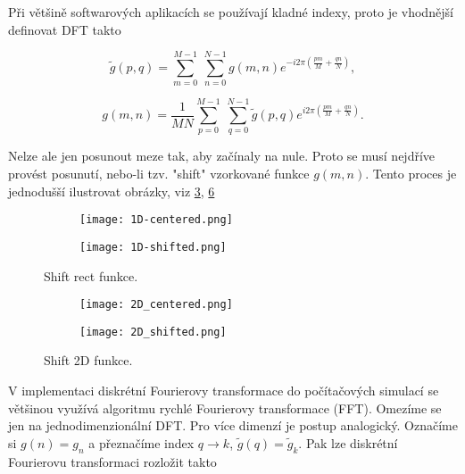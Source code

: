 Při většině softwarových aplikacích se používají kladné indexy, proto je vhodnější definovat DFT takto

\begin{equation}\label{eq:DFT}
\widetilde{g}(p,q) = \sum_{m=0}^{M-1} ~ \sum_{n=0}^{N-1} g(m,n) e^{-i 2 \pi \left( \frac{pm}{M} + \frac{qn}{N} \right)},
\end{equation}

\begin{equation}
g(m,n) = \frac{1}{MN} \sum_{p=0}^{M-1} ~ \sum_{q=0}^{N-1} \widetilde{g}(p,q) e^{i 2 \pi \left( \frac{pm}{M} + \frac{qn}{N} \right)}.
\end{equation}

Nelze ale jen posunout meze tak, aby začínaly na nule. Proto se musí nejdříve provést posunutí, nebo-li tzv. "shift" vzorkované funkce $g(m,n)$. Tento proces je jednodušší ilustrovat obrázky, viz \ref{fig:1D_shift}, \ref{fig:2D_shift}


\begin{figure}[h]
\begin{subfigure}{.5\textwidth}
	\centering
	\texttt{[image: 1D-centered.png]}
	\caption{}
	\label{fig:1D_centered}
\end{subfigure}%
\begin{subfigure}{.5\textwidth}
	\centering
	\texttt{[image: 1D-shifted.png]}
	\caption{}
	\label{fig:1D_shifted}
\end{subfigure}
\caption{Shift rect funkce.}
\label{fig:1D_shift}
\end{figure}

\begin{figure}[h]
\begin{subfigure}{.5\textwidth}
	\centering
	\texttt{[image: 2D\_centered.png]}
	\caption{}
	\label{fig:1D_centered}
\end{subfigure}%
\begin{subfigure}{.5\textwidth}
	\centering
	\texttt{[image: 2D\_shifted.png]}
	\caption{}
	\label{fig:1D_shifted}
\end{subfigure}
\caption{Shift 2D funkce.}
\label{fig:2D_shift}
\end{figure}





V implementaci diskrétní Fourierovy transformace do počítačových simulací se většinou využívá algoritmu rychlé Fourierovy transformace (FFT). Omezíme se jen na jednodimenzionální DFT. Pro více dimenzí je postup analogický. Označíme si $g(n) = g_n$ a přeznačíme index $q \rightarrow k$, $\widetilde{g}(q) = \widetilde{g}_k$. Pak lze diskrétní Fourierovu transformaci rozložit takto


